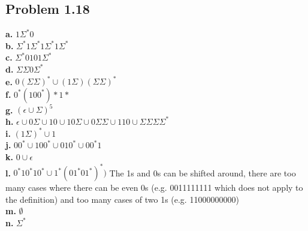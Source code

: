 \documentclass[letter]{article}
\theoremstyle{case}
\begin{document}
\subsection*{Problem 1.18}
\textbf{a. } $1\Sigma^*0$\\ 
\textbf{b. } $\Sigma^*1\Sigma^*1\Sigma^*1\Sigma^*$\\ 
\textbf{c. } $\Sigma^*0101\Sigma^*$ \\ 
\textbf{d. } $\Sigma\Sigma0\Sigma^*$ \\ 
\textbf{e. } $0(\Sigma\Sigma)^* \cup (1\Sigma)(\Sigma\Sigma)^*$\\ 
\textbf{f. } $0^*(100^*)*1*$\\ 
\textbf{g. } $(\epsilon \cup \Sigma)^5$\\ 
\textbf{h. } $\epsilon \cup 0\Sigma \cup 10 \cup 10\Sigma \cup 0\Sigma\Sigma \cup 110 \cup \Sigma\Sigma\Sigma\Sigma^* $\\ 
\textbf{i. } $(1\Sigma)^* \cup 1$\\ 
\textbf{j. } $00^* \cup 100^* \cup 010^* \cup 00^*1$\\ 
\textbf{k. } $0 \cup \epsilon$\\ 
\textbf{l. } $0^*10^*10^* \cup 1^*(01^*01^*)^*)$ The 1s and 0s can be shifted around, there are too many cases where there can be even 0s (e.g. 0011111111 which does not apply to the definition) and too many cases of two 1s (e.g. 11000000000) \\ 
\textbf{m. } $\emptyset$\\ 
\textbf{n. } $\Sigma^*$\\ 
\end{document}
